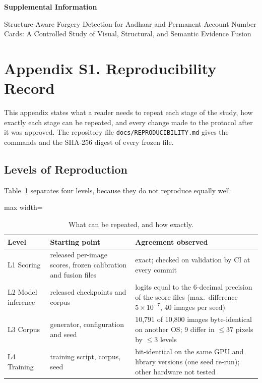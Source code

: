 \documentclass[12pt]{article}
\begin{document}
\begin{center}
{\large\bfseries Supplemental Information\par}
\medskip
Structure-Aware Forgery Detection for Aadhaar and Permanent Account Number Cards: A Controlled Study of Visual, Structural, and Semantic Evidence Fusion
\end{center}
\bigskip
\section*{Appendix S1. Reproducibility Record}



This appendix states what a reader needs to repeat each stage of the
study, how exactly each stage can be repeated, and every change made to
the protocol after it was approved. The repository file
\texttt{docs/REPRODUCIBILITY.md} gives the commands and the SHA-256
digest of every frozen file.

\subsection*{Levels of Reproduction}


Table~\ref{tab:repro-levels} separates four levels, because they do not
reproduce equally well.

\begin{table}[H]
\caption{What can be repeated, and how exactly.}
\label{tab:repro-levels}
\centering
\scriptsize
\setlength{\tabcolsep}{3pt}
\renewcommand{\arraystretch}{1.12}
\begin{adjustbox}{max width=\linewidth}
\begin{tabular}{@{}p{} p{} p{}@{}}
\toprule
Level & Starting point & Agreement observed \\
\midrule
L1 Scoring & released per-image scores, frozen calibration and fusion files
  & exact; checked on validation by CI at every commit \\
L2 Model inference & released checkpoints and corpus
  & logits equal to the 6-decimal precision of the score files
    (max.\ difference $5{\times}10^{-7}$, 40 images per seed) \\
L3 Corpus & generator, configuration and seed
  & 10,791 of 10,800 images byte-identical on another OS; 9 differ in ${\le}37$ pixels by ${\le}3$ levels \\
L4 Training & training script, corpus, seed
  & bit-identical on the same GPU and library versions (one seed re-run); other hardware not tested \\
\bottomrule
\end{tabular}
\end{adjustbox}
\end{table}
\end{document}
